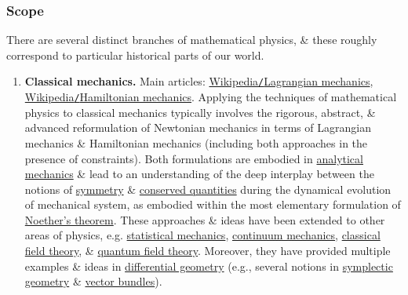 \documentclass{article}
\begin{document}
\subsubsection{Scope}
There are several distinct branches of mathematical physics, \& these roughly correspond to particular historical parts of our world.
\begin{enumerate}
	\item {\bf Classical mechanics.} Main articles: \href{https://en.wikipedia.org/wiki/Lagrangian_mechanics}{Wikipedia{\tt/}Lagrangian mechanics}, \href{https://en.wikipedia.org/wiki/Hamiltonian_mechanics}{Wikipedia{\tt/}Hamiltonian mechanics}. Applying the techniques of mathematical physics to classical mechanics typically involves the rigorous, abstract, \& advanced reformulation of Newtonian mechanics in terms of Lagrangian mechanics \& Hamiltonian mechanics (including both approaches in the presence of constraints). Both formulations are embodied in \href{https://en.wikipedia.org/wiki/Analytical_mechanics}{analytical mechanics} \& lead to an understanding of the deep interplay between the notions of \href{https://en.wikipedia.org/wiki/Symmetry_(physics)}{symmetry} \& \href{https://en.wikipedia.org/wiki/Conservation_law}{conserved quantities} during the dynamical evolution of mechanical system, as embodied within the most elementary formulation of \href{https://en.wikipedia.org/wiki/Noether%27s_theorem}{Noether's theorem}. These approaches \& ideas have been extended to other areas of physics, e.g. \href{https://en.wikipedia.org/wiki/Statistical_mechanics}{statistical mechanics}, \href{https://en.wikipedia.org/wiki/Continuum_mechanics}{continuum mechanics}, \href{https://en.wikipedia.org/wiki/Classical_field_theory}{classical field theory}, \& \href{https://en.wikipedia.org/wiki/Quantum_field_theory}{quantum field theory}. Moreover, they have provided multiple examples \& ideas in \href{https://en.wikipedia.org/wiki/Differential_geometry}{differential geometry} (e.g., several notions in \href{https://en.wikipedia.org/wiki/Symplectic_geometry}{symplectic geometry} \& \href{https://en.wikipedia.org/wiki/Vector_bundle}{vector bundles}).

\end{enumerate}
\end{document}
